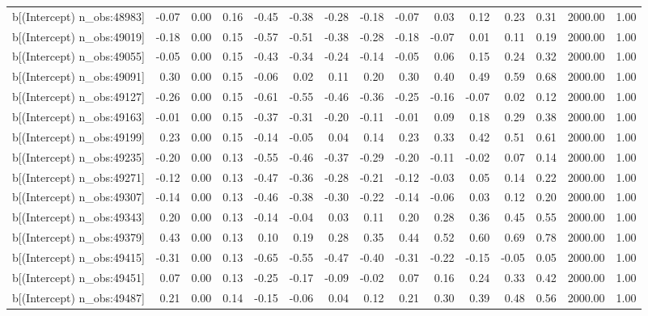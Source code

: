 \begin{table}[ht]
\begin{tabular}{rrrrrrrrrrrrrrr}
  b[(Intercept) n\_obs:48983] & -0.07 & 0.00 & 0.16 & -0.45 & -0.38 & -0.28 & -0.18 & -0.07 & 0.03 & 0.12 & 0.23 & 0.31 & 2000.00 & 1.00 \\ 
  b[(Intercept) n\_obs:49019] & -0.18 & 0.00 & 0.15 & -0.57 & -0.51 & -0.38 & -0.28 & -0.18 & -0.07 & 0.01 & 0.11 & 0.19 & 2000.00 & 1.00 \\ 
  b[(Intercept) n\_obs:49055] & -0.05 & 0.00 & 0.15 & -0.43 & -0.34 & -0.24 & -0.14 & -0.05 & 0.06 & 0.15 & 0.24 & 0.32 & 2000.00 & 1.00 \\ 
  b[(Intercept) n\_obs:49091] & 0.30 & 0.00 & 0.15 & -0.06 & 0.02 & 0.11 & 0.20 & 0.30 & 0.40 & 0.49 & 0.59 & 0.68 & 2000.00 & 1.00 \\ 
  b[(Intercept) n\_obs:49127] & -0.26 & 0.00 & 0.15 & -0.61 & -0.55 & -0.46 & -0.36 & -0.25 & -0.16 & -0.07 & 0.02 & 0.12 & 2000.00 & 1.00 \\ 
  b[(Intercept) n\_obs:49163] & -0.01 & 0.00 & 0.15 & -0.37 & -0.31 & -0.20 & -0.11 & -0.01 & 0.09 & 0.18 & 0.29 & 0.38 & 2000.00 & 1.00 \\ 
  b[(Intercept) n\_obs:49199] & 0.23 & 0.00 & 0.15 & -0.14 & -0.05 & 0.04 & 0.14 & 0.23 & 0.33 & 0.42 & 0.51 & 0.61 & 2000.00 & 1.00 \\ 
  b[(Intercept) n\_obs:49235] & -0.20 & 0.00 & 0.13 & -0.55 & -0.46 & -0.37 & -0.29 & -0.20 & -0.11 & -0.02 & 0.07 & 0.14 & 2000.00 & 1.00 \\ 
  b[(Intercept) n\_obs:49271] & -0.12 & 0.00 & 0.13 & -0.47 & -0.36 & -0.28 & -0.21 & -0.12 & -0.03 & 0.05 & 0.14 & 0.22 & 2000.00 & 1.00 \\ 
  b[(Intercept) n\_obs:49307] & -0.14 & 0.00 & 0.13 & -0.46 & -0.38 & -0.30 & -0.22 & -0.14 & -0.06 & 0.03 & 0.12 & 0.20 & 2000.00 & 1.00 \\ 
  b[(Intercept) n\_obs:49343] & 0.20 & 0.00 & 0.13 & -0.14 & -0.04 & 0.03 & 0.11 & 0.20 & 0.28 & 0.36 & 0.45 & 0.55 & 2000.00 & 1.00 \\ 
  b[(Intercept) n\_obs:49379] & 0.43 & 0.00 & 0.13 & 0.10 & 0.19 & 0.28 & 0.35 & 0.44 & 0.52 & 0.60 & 0.69 & 0.78 & 2000.00 & 1.00 \\ 
  b[(Intercept) n\_obs:49415] & -0.31 & 0.00 & 0.13 & -0.65 & -0.55 & -0.47 & -0.40 & -0.31 & -0.22 & -0.15 & -0.05 & 0.05 & 2000.00 & 1.00 \\ 
  b[(Intercept) n\_obs:49451] & 0.07 & 0.00 & 0.13 & -0.25 & -0.17 & -0.09 & -0.02 & 0.07 & 0.16 & 0.24 & 0.33 & 0.42 & 2000.00 & 1.00 \\ 
  b[(Intercept) n\_obs:49487] & 0.21 & 0.00 & 0.14 & -0.15 & -0.06 & 0.04 & 0.12 & 0.21 & 0.30 & 0.39 & 0.48 & 0.56 & 2000.00 & 1.00 \\ 

\end{tabular}
\end{table}
